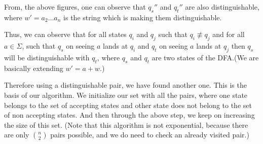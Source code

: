 \documentclass[english, 11pt]{article}
\begin{document}
\clearpage
\begin{figure}[htbp]
\begin{center}
\end{center}
\label{fig:2sta}
\end{figure}
\begin{figure}[htbp]
\begin{center}
\end{center}
\label{fig:2sta}
\end{figure}

From, the above figures, one can observe that $q_s''$ and $q_t''$ are also distinguishable, where $w' = a_2\dots a_n$ is the string which is making them distinguishable.


Thus, we can observe that for all states $q_i$ and $q_j$ such that $q_i \not\equiv q_j$ and for all $a \in \Sigma$, such that $q_s$ on seeing $a$ lands at $q_i$ and $q_t$ on seeing $a$ lands at $q_j$ then $q_s$ will be distinguishable with $q_t$, where $q_s$ and $q_t$ are two states of the DFA.(We are basically extending $w' = a + w$.)


Therefore using a distinguishable pair, we have found another one. This is the basis of our algorithm. We initialize our set with all the pairs, where one state belongs to the set of accepting states and other state does not belong to the set of non accepting states. And then through the above step, we keep on increasing the size of this set. (Note that this algorithm is not exponential, because there are only $\binom{n}{2}$ pairs possible, and we do need to check an already visited pair.)
\end{document}
